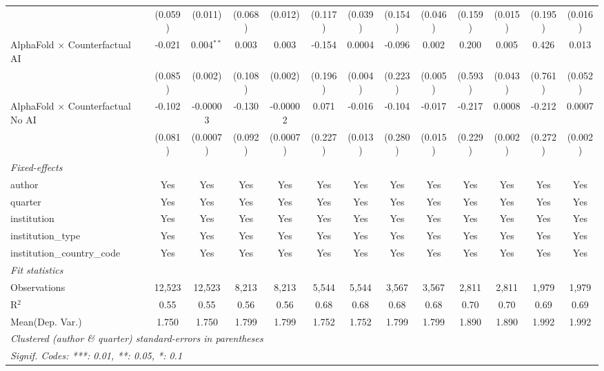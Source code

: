 \begin{tabular}{lcccccccccccc}
                                            & (0.059) & (0.011)      & (0.068) & (0.012)      & (0.117) & (0.039) & (0.154)     & (0.046) & (0.159) & (0.015)       & (0.195) & (0.016)\\   
   AlphaFold $\times$ Counterfactual AI     & -0.021  & 0.004$^{**}$ & 0.003   & 0.003        & -0.154  & 0.0004  & -0.096      & 0.002   & 0.200   & 0.005         & 0.426   & 0.013\\   
                                            & (0.085) & (0.002)      & (0.108) & (0.002)      & (0.196) & (0.004) & (0.223)     & (0.005) & (0.593) & (0.043)       & (0.761) & (0.052)\\   
   AlphaFold $\times$ Counterfactual No AI  & -0.102  & -0.00003     & -0.130  & -0.00002     & 0.071   & -0.016  & -0.104      & -0.017  & -0.217  & 0.0008        & -0.212  & 0.0007\\   
                                            & (0.081) & (0.0007)     & (0.092) & (0.0007)     & (0.227) & (0.013) & (0.280)     & (0.015) & (0.229) & (0.002)       & (0.272) & (0.002)\\   
   \midrule
   \emph{Fixed-effects}\\
   author                                   & Yes     & Yes          & Yes     & Yes          & Yes     & Yes     & Yes         & Yes     & Yes     & Yes           & Yes     & Yes\\  
   quarter                                  & Yes     & Yes          & Yes     & Yes          & Yes     & Yes     & Yes         & Yes     & Yes     & Yes           & Yes     & Yes\\  
   institution                              & Yes     & Yes          & Yes     & Yes          & Yes     & Yes     & Yes         & Yes     & Yes     & Yes           & Yes     & Yes\\  
   institution\_type                        & Yes     & Yes          & Yes     & Yes          & Yes     & Yes     & Yes         & Yes     & Yes     & Yes           & Yes     & Yes\\  
   institution\_country\_code               & Yes     & Yes          & Yes     & Yes          & Yes     & Yes     & Yes         & Yes     & Yes     & Yes           & Yes     & Yes\\  
   \midrule
   \emph{Fit statistics}\\
   Observations                             & 12,523  & 12,523       & 8,213   & 8,213        & 5,544   & 5,544   & 3,567       & 3,567   & 2,811   & 2,811         & 1,979   & 1,979\\  
   R$^2$                                    & 0.55    & 0.55         & 0.56    & 0.56         & 0.68    & 0.68    & 0.68        & 0.68    & 0.70    & 0.70          & 0.69    & 0.69\\  
Mean(Dep. Var.) & 1.750 & 1.750 & 1.799 & 1.799 & 1.752 & 1.752 & 1.799 & 1.799 & 1.890 & 1.890 & 1.992 & 1.992 \\
   \midrule \midrule
   \multicolumn{13}{l}{\emph{Clustered (author \& quarter) standard-errors in parentheses}}\\
   \multicolumn{13}{l}{\emph{Signif. Codes: ***: 0.01, **: 0.05, *: 0.1}}\\
\end{tabular}
\par\endgroup
